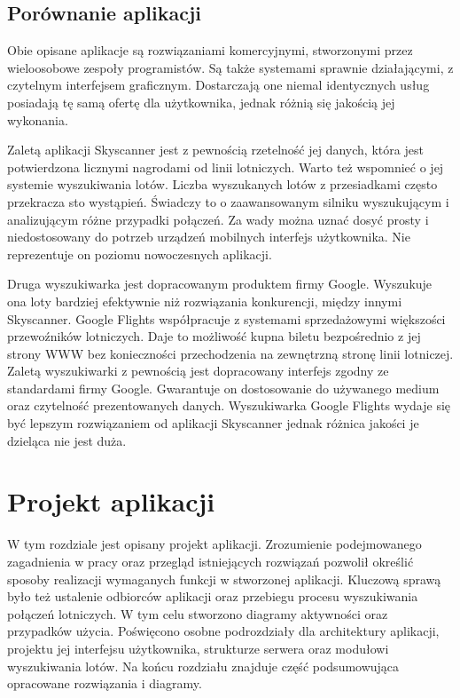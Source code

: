 \documentclass[12pt, twoside]{report}
\begin{document}
\section{Porównanie aplikacji}
Obie opisane aplikacje są rozwiązaniami komercyjnymi, stworzonymi przez wieloosobowe zespoły programistów. Są także systemami sprawnie działającymi, z czytelnym interfejsem graficznym. Dostarczają one niemal identycznych usług {\dywiz} posiadają tę samą ofertę dla użytkownika, jednak różnią się jakością jej wykonania. 

Zaletą aplikacji Skyscanner jest z pewnością rzetelność jej danych, która jest potwierdzona licznymi nagrodami od linii lotniczych. Warto też wspomnieć o jej systemie wyszukiwania lotów. Liczba wyszukanych lotów z przesiadkami często przekracza sto wystąpień. Świadczy to o zaawansowanym silniku wyszukującym i analizującym różne przypadki połączeń. Za wady można uznać dosyć prosty i niedostosowany do potrzeb urządzeń mobilnych interfejs użytkownika. Nie reprezentuje on poziomu nowoczesnych aplikacji. 

Druga wyszukiwarka jest dopracowanym produktem firmy Google. Wyszukuje ona loty bardziej efektywnie niż rozwiązania konkurencji, między innymi Skyscanner. Google Flights współpracuje z systemami sprzedażowymi większości przewoźników lotniczych. Daje to możliwość kupna biletu bezpośrednio z jej strony WWW bez konieczności przechodzenia na zewnętrzną stronę linii lotniczej. Zaletą wyszukiwarki z pewnością jest dopracowany interfejs zgodny ze standardami firmy Google. Gwarantuje on dostosowanie do używanego medium oraz czytelność prezentowanych danych. Wyszukiwarka Google Flights wydaje się być lepszym rozwiązaniem od aplikacji Skyscanner jednak różnica jakości je dzieląca nie jest duża.

  


\chapter{Projekt aplikacji}
W tym rozdziale jest opisany projekt aplikacji. Zrozumienie podejmowanego zagadnienia w pracy oraz przegląd istniejących rozwiązań pozwolił określić sposoby realizacji wymaganych funkcji w stworzonej aplikacji.  Kluczową sprawą było też ustalenie odbiorców aplikacji oraz przebiegu procesu wyszukiwania połączeń lotniczych. W tym celu stworzono diagramy aktywności oraz przypadków użycia. Poświęcono osobne podrozdziały dla architektury aplikacji, projektu jej interfejsu użytkownika, strukturze serwera oraz modułowi wyszukiwania lotów. Na końcu rozdziału znajduje część podsumowująca opracowane rozwiązania i diagramy.
\end{document}
